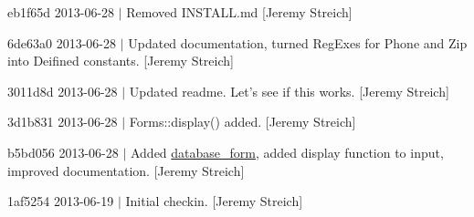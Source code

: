 \begin{DoxyItemize}
\item eb1f65d 2013-\/06-\/28 $|$ Removed I\-N\-S\-T\-A\-L\-L.\-md \mbox{[}Jeremy Streich\mbox{]}
\item 6de63a0 2013-\/06-\/28 $|$ Updated documentation, turned Reg\-Exes for Phone and Zip into Deifined constants. \mbox{[}Jeremy Streich\mbox{]}
\item 3011d8d 2013-\/06-\/28 $|$ Updated readme. Let's see if this works. \mbox{[}Jeremy Streich\mbox{]}
\item 3d1b831 2013-\/06-\/28 $|$ Forms\-::display() added. \mbox{[}Jeremy Streich\mbox{]}
\item b5bd056 2013-\/06-\/28 $|$ Added \hyperlink{classdatabase__form}{database\-\_\-form}, added display function to input, improved documentation. \mbox{[}Jeremy Streich\mbox{]}
\item 1af5254 2013-\/06-\/19 $|$ Initial checkin. \mbox{[}Jeremy Streich\mbox{]} 
\end{DoxyItemize}